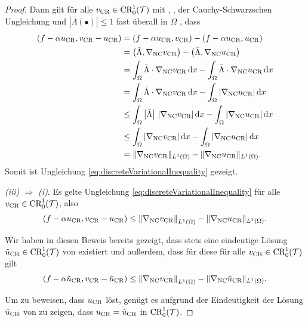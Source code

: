 \begin{proof}
  Dann gilt für alle $v_\textup{CR}\in\textup{CR}^1_0(\mathcal{T})$ mit
  ,
  , der Cauchy-Schwarzschen
  Ungleichung und $\left|\bar\Lambda(\bullet)\right|\leq 1$ fast überall in
  $\Omega$ , dass
  \begin{align*}
    (f-\alpha u_\textup{CR},v_\textup{CR}-u_\textup{CR}) 
    &= 
    (f-\alpha u_\textup{CR},v_\textup{CR}) 
    - (f-\alpha u_\textup{CR},u_\textup{CR}) \\
    &=
    \left(\bar\Lambda,\nabla_\textup{NC}v_\textup{CR}\right)
    - \left(\bar\Lambda,\nabla_\textup{NC}u_\textup{CR}\right)\\
    &=
    \int_\Omega\bar\Lambda\cdot\nabla_\textup{NC}v_\textup{CR}\,\mathrm{d}x
    - \int_\Omega\bar\Lambda\cdot\nabla_\textup{NC}u_\textup{CR}\,\mathrm{d}x\\
    &=
    \int_\Omega\bar\Lambda\cdot\nabla_\textup{NC}v_\textup{CR}\,\mathrm{d}x
    - \int_\Omega|\nabla_\textup{NC}u_\textup{CR}|\,\mathrm{d}x\\
    &\leq 
    \int_\Omega\left|\bar\Lambda\right|\,|\nabla_\textup{NC}v_\textup{CR}|\,\mathrm{d}x
    - \int_\Omega|\nabla_\textup{NC}u_\textup{CR}|\,\mathrm{d}x\\
    &\leq 
    \int_\Omega|\nabla_\textup{NC}v_\textup{CR}|\,\mathrm{d}x
    - \int_\Omega|\nabla_\textup{NC}u_\textup{CR}|\,\mathrm{d}x\\
    &=
    \Vert\nabla_\textup{NC}v_\textup{CR}\Vert_{L^1(\Omega)}
    -\Vert\nabla_\textup{NC}u_\textup{CR}\Vert_{L^1(\Omega)}.
  \end{align*}
  Somit ist Ungleichung \eqref{eq:discreteVariationalInequality} gezeigt.

  \textit{(iii) $\Rightarrow$ (i)}.
  Es gelte Ungleichung \eqref{eq:discreteVariationalInequality} für alle
  $v_\textup{CR}\in\textup{CR}^1_0(\mathcal{T})$, also
  \begin{align*}
    \left(f-\alpha u_\textup{CR},v_\textup{CR}-u_\textup{CR}\right) 
    \leq
    \left\Vert\nabla_\textup{NC}v_\textup{CR}\right\Vert_{L^1(\Omega)}
    -\Vert\nabla_\textup{NC}u_\textup{CR}\Vert_{L^1(\Omega)}.
  \end{align*}


  Wir haben in diesen Beweis bereits gezeigt, dass stets eine eindeutige Lösung
  $\tilde{u}_{\textup{CR}}\in\textup{CR}^1_0(\mathcal{T})$ von  existiert
  und außerdem, dass für diese
  für alle $v_\textup{CR}\in\textup{CR}^1_0(\mathcal{T})$ gilt
  \begin{align*}
    \left(f-\alpha\tilde{u}_{\textup{CR}},v_\textup{CR}-\tilde{u}_{\textup{CR}}\right) 
    \leq
    \left\Vert\nabla_\textup{NC}v_\textup{CR}\right\Vert_{L^1(\Omega)}
    -\Vert\nabla_\textup{NC}\tilde{u}_{\textup{CR}}\Vert_{L^1(\Omega)}.
  \end{align*}

  Um zu beweisen, dass $u_\textup{CR}$  löst, genügt es
  aufgrund der Eindeutigkeit der Lösung $\tilde{u}_{\textup{CR}}$ von
   zu zeigen, dass $u_\textup{CR}=\tilde{u}_{\textup{CR}}$ in
  $\textup{CR}^1_0(\mathcal{T})$.


\end{proof}
